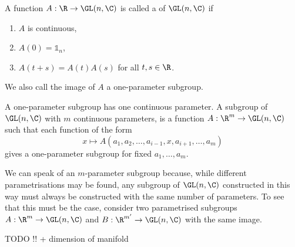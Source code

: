 \begin{definition}
A function $A : \R \to \GL(n, \C)$ is called a  of $\GL(n, \C)$ if
\begin{enumerate}
\item $A$ is continuous,
\item $A(0) = \mathbb{1}_n$,
\item $A(t+s) = A(t)A(s)$ for all $t,s \in \R$.
\end{enumerate}
We also call the image of $A$ a one-parameter subgroup.
\end{definition}

A one-parameter subgroup has one continuous parameter. A subgroup of $\GL(n, \C)$ with $m$ continuous parameters, is a function $A : \R^m \to \GL(n, \C)$ such that each function of the form
\[ x \mapsto A(a_1, a_2, \ldots , a_{i-1}, x, a_{i+1}, \ldots, a_m) \]
gives a one-parameter subgroup for fixed $a_1,\ldots, a_m$.

We can speak of an $m$-parameter subgroup because, while different parametrisations may be found, any subgroup of $\GL(n,\C)$ constructed in this way must always be constructed with the same number of parameters. To see that this must be the case, consider two parametrised subgroups $A : \R^m \to \GL(n, \C)$ and $B : \R^{m'} \to \GL(n, \C)$ with the same image.

TODO !! + dimension of manifold

